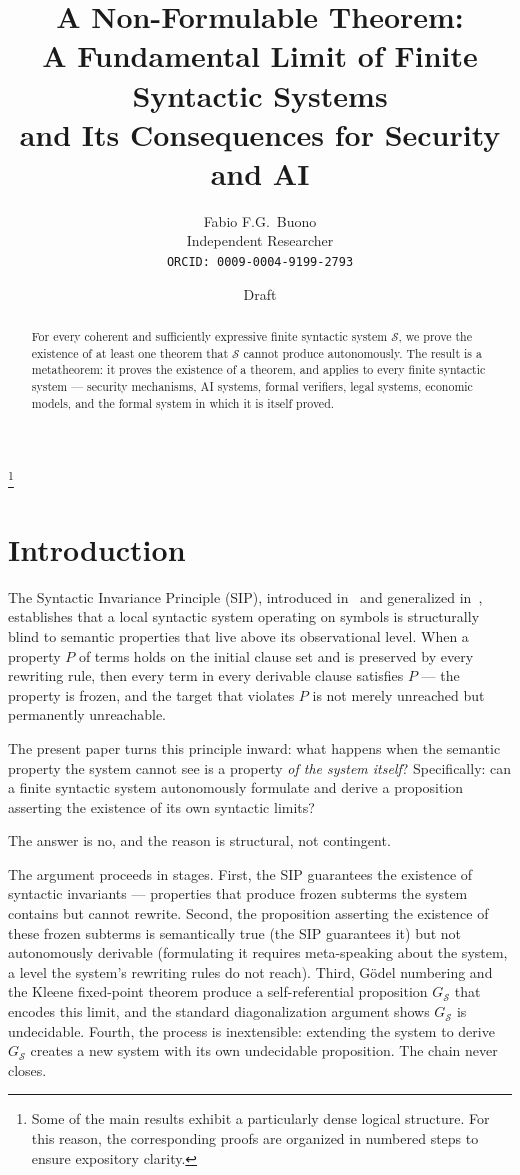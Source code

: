 \documentclass[11pt]{article}
\title{A Non-Formulable Theorem:\\
A Fundamental Limit of Finite Syntactic Systems\\
and Its Consequences for Security and AI}
\author{
  Fabio F.G.\ Buono\\
  \small Independent Researcher\\
  \small \texttt{ORCID: 0009-0004-9199-2793}
}
\date{Draft}
\begin{document}
\maketitle

\begin{abstract}
For every coherent and sufficiently expressive finite syntactic system
$\mathcal{S}$, we prove the existence of at least one theorem that
$\mathcal{S}$ cannot produce autonomously. The result is a metatheorem: 
it proves the existence of a theorem,
and applies to every finite syntactic system --- security mechanisms,
AI systems, formal verifiers, legal systems, economic models, and the
formal system in which it is itself proved.
\end{abstract}

\newpage


\tableofcontents

\footnote{Some of the main results exhibit a particularly dense logical structure. 
For this reason, the corresponding proofs are organized in numbered steps to 
ensure expository clarity.}

\newpage



\section{Introduction}
\label{sec:intro}


The Syntactic Invariance Principle (SIP), introduced
in~\cite{buono2026sip} and generalized in~\cite{buono2026obstruction},
establishes that a local syntactic system operating on symbols is
structurally blind to semantic properties that live above its
observational level. When a property $P$ of terms holds on the initial
clause set and is preserved by every rewriting rule, then every term in
every derivable clause satisfies $P$ --- the property is frozen, and
the target that violates $P$ is not merely unreached but permanently
unreachable.

The present paper turns this principle inward: what happens when the
semantic property the system cannot see is a property \emph{of the system
itself}? Specifically: can a finite syntactic system autonomously
formulate and derive a proposition asserting the existence of its own
syntactic limits?

The answer is no, and the reason is structural, not contingent.

The argument proceeds in stages. First, the SIP guarantees the existence
of syntactic invariants --- properties that produce frozen subterms the
system contains but cannot rewrite. Second, the proposition asserting the
existence of these frozen subterms is semantically true (the SIP
guarantees it) but not autonomously derivable (formulating it requires
meta-speaking about the system, a level the system's rewriting rules do
not reach). Third, G\"odel numbering and the Kleene fixed-point theorem
produce a self-referential proposition $G_{\mathcal{S}}$ that encodes
this limit, and the standard diagonalization argument shows
$G_{\mathcal{S}}$ is undecidable. Fourth, the process is inextensible:
extending the system to derive $G_{\mathcal{S}}$ creates a new system
with its own undecidable proposition. The chain never closes.
\end{document}
